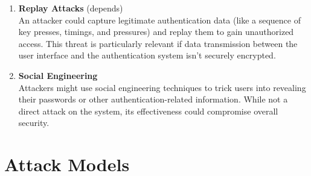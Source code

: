 \documentclass{article}
\begin{document}
\begin{enumerate}[label=\arabic*.]
    \item \textbf{Replay Attacks} (depends) \\
    An attacker could capture legitimate authentication data (like a sequence of key presses, timings, and pressures) and replay them to gain unauthorized access. This threat is particularly relevant if data transmission between the user interface and the authentication system isn't securely encrypted.
    
    \item \textbf{Social Engineering} \\
    Attackers might use social engineering techniques to trick users into revealing their passwords or other authentication-related information. While not a direct attack on the system, its effectiveness could compromise overall security.
\end{enumerate}

\section*{Attack Models}
\end{document}

